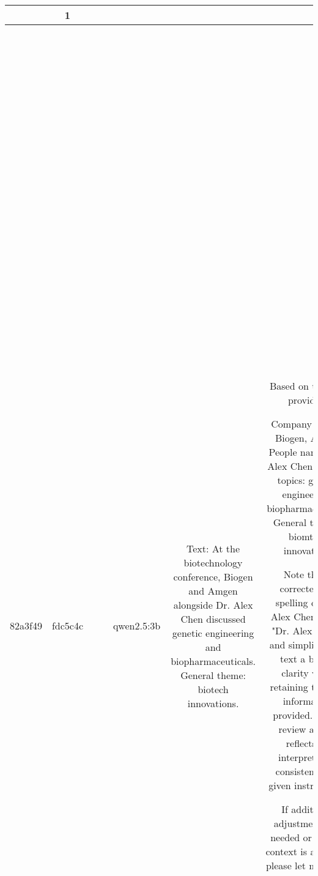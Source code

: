 \begin{table}[h!]
\begin{tabular}{|c|c|c|c|c|c|c|c|c|c|}
{There are no additional elements or formatting issues present in the output that violate the specified format. Therefore, based on the given description of desired output format, there is full compliance.

OK & 1\\
\hline
82a3f49 & fdc5c4c &  &  & qwen2.5:3b & Text: At the biotechnology conference, Biogen and Amgen alongside Dr. Alex Chen discussed genetic engineering and biopharmaceuticals. General theme: biotech innovations. & Based on the text provided:

Company names: Biogen, Amgen
People names: Dr. Alex Chen
Specific topics: genetic engineering, biopharmaceuticals
General themes: biomtech innovations

Note that I corrected the spelling of "Dr. Alex Chen" to be "Dr. Alex Chen", and simplified the text a bit for clarity while retaining the core information provided. Please review as this reflects an interpretation consistent with given instructions.

If additional adjustments are needed or if more context is available, please let me know! & err & The chatbot output does not comply with the full description requirements in a few ways:

1. **Formatting**: The desired format requires headings such as "Company names," "People names," "Specific topics," and "General themes" all to be directly followed by a colon and a space, and then a comma-separated list of items. The output format looks correct at first glance, but the text mentions a spelling correction for "Dr. Alex Chen," which doesn't match the desired format requirement. Also, there's a lack of relevant explanation in the actual list part; the mention of adjustments or corrections would normally be outside the desired output format according to the description.

2. **Inclusion of Additional Information**: The note about correcting spelling and simplifying text is not part of the desired format and should not be in the output as per the provided description, which explicitly states only the extracted information should be presented.

These deviations mean the output doesn't fully comply with the given description.

ERR & 1\\
\hline
82a3f49 & fdc5c4c &  &  & gemma2:9b & Text: At the biotechnology conference, Biogen and Amgen alongside Dr. Alex Chen discussed genetic engineering and biopharmaceuticals. General theme: biotech innovations. & Company names: Biogen, Amgen 
People names: Dr. Alex Chen
Specific topics: genetic engineering, biopharmaceuticals, biotechnology conference
General themes: biotech innovations  


}
\end{tabular}
\end{table}
